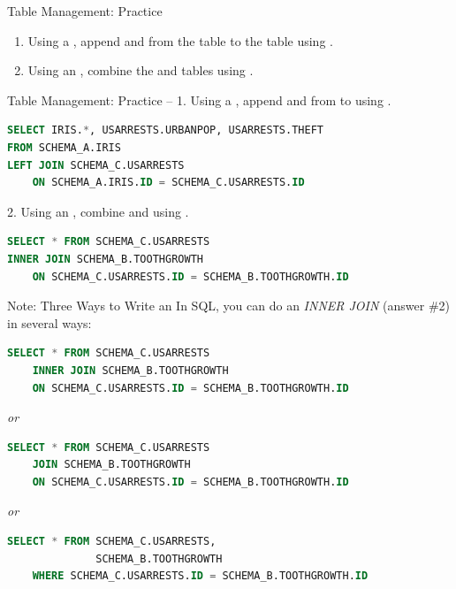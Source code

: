 \documentclass{beamer}
\begin{document}
\begin{frame}{Table Management: Practice}
\begin{prob}
\begin{enumerate}
  \item Using a , append  and  from the
         table to the  table using .
  \vspace{0.5em}
  \item Using an , combine the  and
         tables using .
\end{enumerate}
\end{prob}
\end{frame}

\begin{frame}[fragile]{Table Management: Practice -- }
\small
1. Using a , append  and  from
 to  using .
\begin{lstlisting}[language=SQL]
SELECT IRIS.*, USARRESTS.URBANPOP, USARRESTS.THEFT
FROM SCHEMA_A.IRIS
LEFT JOIN SCHEMA_C.USARRESTS
    ON SCHEMA_A.IRIS.ID = SCHEMA_C.USARRESTS.ID
\end{lstlisting}
\vspace{0.4em}
2. Using an , combine  and
 using .
\begin{lstlisting}[language=SQL]
SELECT * FROM SCHEMA_C.USARRESTS
INNER JOIN SCHEMA_B.TOOTHGROWTH
    ON SCHEMA_C.USARRESTS.ID = SCHEMA_B.TOOTHGROWTH.ID
\end{lstlisting}
\end{frame}

\begin{frame}[fragile]{Note: Three Ways to Write an }
In SQL, you can do an \textit{INNER JOIN} (answer \#2) in several ways:
\begin{lstlisting}[language=SQL]
SELECT * FROM SCHEMA_C.USARRESTS
    INNER JOIN SCHEMA_B.TOOTHGROWTH
    ON SCHEMA_C.USARRESTS.ID = SCHEMA_B.TOOTHGROWTH.ID
\end{lstlisting}
\textit{or}
\begin{lstlisting}[language=SQL]
SELECT * FROM SCHEMA_C.USARRESTS
    JOIN SCHEMA_B.TOOTHGROWTH
    ON SCHEMA_C.USARRESTS.ID = SCHEMA_B.TOOTHGROWTH.ID
\end{lstlisting}
\textit{or}
\begin{lstlisting}[language=SQL]
SELECT * FROM SCHEMA_C.USARRESTS,
              SCHEMA_B.TOOTHGROWTH
    WHERE SCHEMA_C.USARRESTS.ID = SCHEMA_B.TOOTHGROWTH.ID
\end{lstlisting}
\end{frame}
\end{document}
